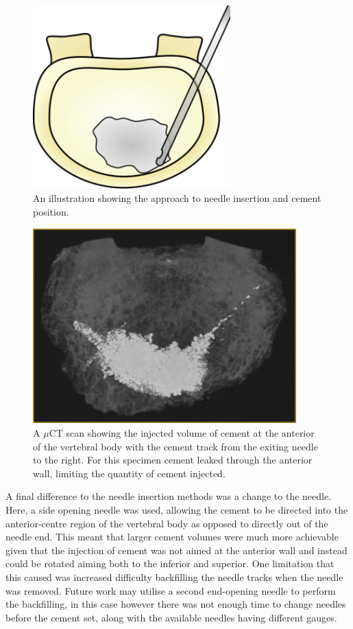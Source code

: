 \begin{figure}[h!]
  \centering
  \includegraphics[width=3in]{Chapters/Chapter_HT_images/vp_illustration.png}
  \caption{An illustration showing the approach to needle insertion and cement
position.}
  \label{fig:vp-ill}
\end{figure}


\begin{figure}[h!]
  \centering
 
\includegraphics[width=4in]{Chapters/Chapter_HT_images/vp_illustration_scan.png}
  \caption{A $\mu$CT scan showing the injected volume of cement at the anterior
of the vertebral body with the cement track from the exiting needle to the
right. For this specimen cement leaked through the anterior wall, limiting the
quantity of cement injected.}
  \label{fig:vp-ill_scan}
\end{figure}

A final difference to the needle insertion methods was a change to the needle.
Here, a side opening needle was used, allowing the cement to be directed into
the anterior-centre region of the vertebral body as opposed to directly out of
the needle end. This meant that larger cement volumes were much more achievable
given that the injection of cement was not aimed at the anterior wall and
instead could be rotated aiming both to the inferior and superior. One
limitation that this caused was increased difficulty backfilling the needle
tracks when the needle was removed. Future work may utilise a second
end-opening needle to perform the backfilling, in this case however there was
not enough time to change needles before the cement set, along with the
available needles having different gauges.

